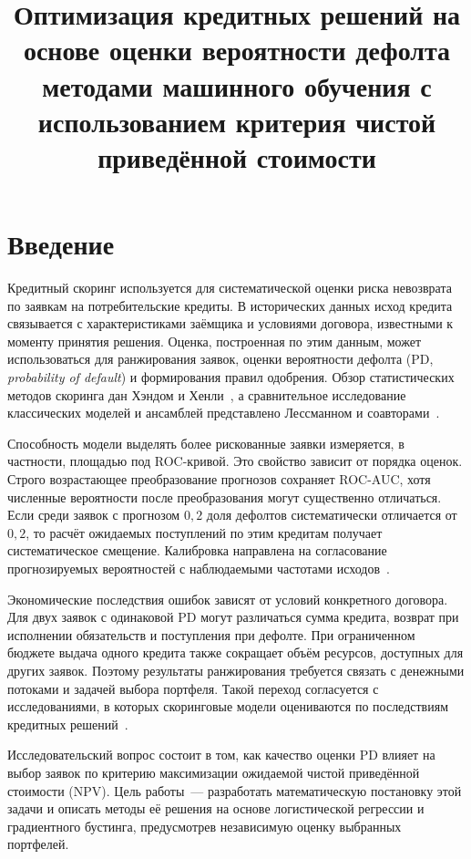 \documentclass{misisarticle}
\title{Оптимизация кредитных решений на основе оценки вероятности дефолта методами машинного обучения с использованием критерия чистой приведённой стоимости}
\begin{document}
\maketitle

\section{Введение}

Кредитный скоринг используется для систематической оценки риска невозврата по заявкам на потребительские кредиты. В исторических данных исход кредита связывается с характеристиками заёмщика и условиями договора, известными к моменту принятия решения. Оценка, построенная по этим данным, может использоваться для ранжирования заявок, оценки вероятности дефолта (PD, \textit{probability of default}) и формирования правил одобрения. Обзор статистических методов скоринга дан Хэндом и Хенли~\cite{hand}, а сравнительное исследование классических моделей и ансамблей представлено Лессманном и соавторами~\cite{lessmann}.

Способность модели выделять более рискованные заявки измеряется, в частности, площадью под ROC-кривой. Это свойство зависит от порядка оценок. Строго возрастающее преобразование прогнозов сохраняет ROC-AUC, хотя численные вероятности после преобразования могут существенно отличаться. Если среди заявок с прогнозом $0{,}2$ доля дефолтов систематически отличается от $0{,}2$, то расчёт ожидаемых поступлений по этим кредитам получает систематическое смещение. Калибровка направлена на согласование прогнозируемых вероятностей с наблюдаемыми частотами исходов~\cite{niculescu}.

Экономические последствия ошибок зависят от условий конкретного договора. Для двух заявок с одинаковой PD могут различаться сумма кредита, возврат при исполнении обязательств и поступления при дефолте. При ограниченном бюджете выдача одного кредита также сокращает объём ресурсов, доступных для других заявок. Поэтому результаты ранжирования требуется связать с денежными потоками и задачей выбора портфеля. Такой переход согласуется с исследованиями, в которых скоринговые модели оцениваются по последствиям кредитных решений~\cite{verbraken,lessmann}.

Исследовательский вопрос состоит в том, как качество оценки PD влияет на выбор заявок по критерию максимизации ожидаемой чистой приведённой стоимости (NPV). Цель работы~--- разработать математическую постановку этой задачи и описать методы её решения на основе логистической регрессии и градиентного бустинга, предусмотрев независимую оценку выбранных портфелей.
\end{document}
